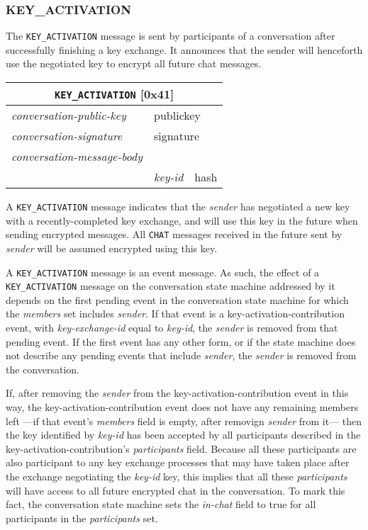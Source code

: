 \documentclass{article}
\def\message#1{\texttt{#1}}
\def\field#1{\textit{#1}}
\def\smfield#1{\textsl{#1}}
\def\type#1{\textsf{#1}}
\newenvironment{conversationmessage}[2]{
\newcommand{\messagefield}[2]{
& \field{##1} & \type{##2} \\
\hline
}
\hspace{2em minus 2em}\begin{tabular}{|l|l|l|}
\hline
\multicolumn{3}{|c|}{\message{#1} [#2]} \\
\hline
\hline
\field{conversation-public-key} & \multicolumn{2}{l|}{\type{publickey}} \\
\hline
\field{conversation-signature} & \multicolumn{2}{l|}{\type{signature}} \\
\hline
\field{conversation-message-body} & \multicolumn{2}{l|}{} \\
\hline
}{
\end{tabular}
}
\begin{document}
\subsubsection{KEY\_ACTIVATION}
\label{sec:messages/key-activation}

The \message{KEY\_ACTIVATION} message is sent by participants of a conversation after successfully finishing a key exchange.
It announces that the sender will henceforth use the negotiated key to encrypt all future chat messages.

\begin{conversationmessage}{KEY\_ACTIVATION}{0x41}
\messagefield{key-id}{hash}
\end{conversationmessage}

A \message{KEY\_ACTIVATION} message indicates that the \field{sender} has negotiated a new key with a recently-completed key exchange, and will use this key in the future when sending encrypted messages.
All \message{CHAT} messages received in the future sent by \field{sender} will be assumed encrypted using this key.

A \message{KEY\_ACTIVATION} message is an event message.
As such, the effect of a \message{KEY\_ACTIVATION} message on the conversation state machine addressed by it depends on the first pending event in the conversation state machine for which the \smfield{members} set includes \field{sender}.
If that event is a \type{key-activation-contribution} event, with \smfield{key-exchange-id} equal to \field{key-id}, the \field{sender} is removed from that pending event.
If the first event has any other form, or if the state machine does not describe any pending events that include \field{sender}, the \field{sender} is removed from the conversation.

If, after removing the \field{sender} from the \type{key-activation-contribution} event in this way, the \type{key-activation-contribution} event does not have any remaining members left ---if that event's \smfield{members} field is empty, after removign \field{sender} from it--- then the key identified by \field{key-id} has been accepted by all participants described in the \type{key-activation-contribution}'s \smfield{participants} field.
Because all these participants are also participant to any key exchange processes that may have taken place after the exchange negotiating the \field{key-id} key, this implies that all these \smfield{participants} will have access to all future encrypted chat in the conversation.
To mark this fact, the conversation state machine sets the \smfield{in-chat} field to \textsf{true} for all participants in the \smfield{participants} set.
\end{document}
